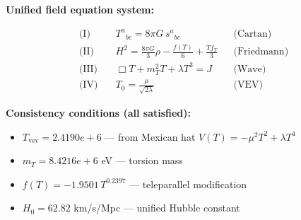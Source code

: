 
\textbf{Unified field equation system:}

\begin{align}
  \text{(I)} \quad & T^a{}_{bc} = 8\pi G \, s^a{}_{bc} && \text{(Cartan)} \\
  \text{(II)} \quad & H^2 = \frac{8\pi G}{3}\rho - \frac{f(T)}{6} + \frac{Tf_T}{3} && \text{(Friedmann)} \\
  \text{(III)} \quad & \Box T + m_T^2 T + \lambda T^3 = J && \text{(Wave)} \\
  \text{(IV)} \quad & T_0 = \frac{\mu}{\sqrt{2\lambda}} && \text{(VEV)}
\end{align}

\textbf{Consistency conditions (all satisfied):}
\begin{itemize}
  \item $T_{\text{vev}} = 2.4190e+6$ — from Mexican hat $V(T) = -\mu^2 T^2 + \lambda T^4$
  \item $m_T = 8.4216e+6$ eV — torsion mass
  \item $f(T) = -1.9501 \, T^{0.2397}$ — teleparallel modification
  \item $H_0 = 62.82$ km/s/Mpc — unified Hubble constant
\end{itemize}